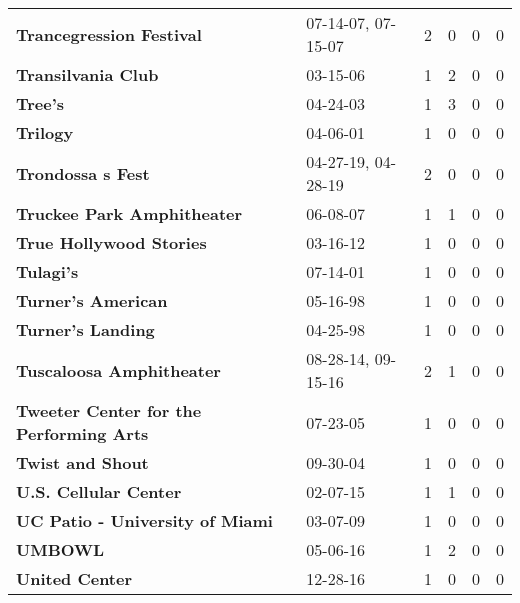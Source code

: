 \begin{supertabular}{p{0.4\textwidth}p{0.3\textwidth}p{0.05\textwidth}p{0.05\textwidth}p{0.05\textwidth}p{0.05\textwidth}}
                                     \textbf{Trancegression Festival} &  07-14-07, 07-15-07 &  2 &  0 &  0 &  0 \\
                                           \textbf{Transilvania Club} &            03-15-06 &  1 &  2 &  0 &  0 \\
                                                      \textbf{Tree's} &            04-24-03 &  1 &  3 &  0 &  0 \\
                                                     \textbf{Trilogy} &            04-06-01 &  1 &  0 &  0 &  0 \\
                                            \textbf{Trondossa s Fest} &  04-27-19, 04-28-19 &  2 &  0 &  0 &  0 \\
                                   \textbf{Truckee Park Amphitheater} &            06-08-07 &  1 &  1 &  0 &  0 \\
                                      \textbf{True Hollywood Stories} &            03-16-12 &  1 &  0 &  0 &  0 \\
                                                    \textbf{Tulagi's} &            07-14-01 &  1 &  0 &  0 &  0 \\
                                           \textbf{Turner's American} &            05-16-98 &  1 &  0 &  0 &  0 \\
                                            \textbf{Turner's Landing} &            04-25-98 &  1 &  0 &  0 &  0 \\
                                     \textbf{Tuscaloosa Amphitheater} &  08-28-14, 09-15-16 &  2 &  1 &  0 &  0 \\
                      \textbf{Tweeter Center for the Performing Arts} &            07-23-05 &  1 &  0 &  0 &  0 \\
                                             \textbf{Twist and Shout} &            09-30-04 &  1 &  0 &  0 &  0 \\
                                        \textbf{U.S. Cellular Center} &            02-07-15 &  1 &  1 &  0 &  0 \\
                              \textbf{UC Patio - University of Miami} &            03-07-09 &  1 &  0 &  0 &  0 \\
                                                      \textbf{UMBOWL} &            05-06-16 &  1 &  2 &  0 &  0 \\
                                               \textbf{United Center} &            12-28-16 &  1 &  0 &  0 &  0 \\

\end{supertabular}
